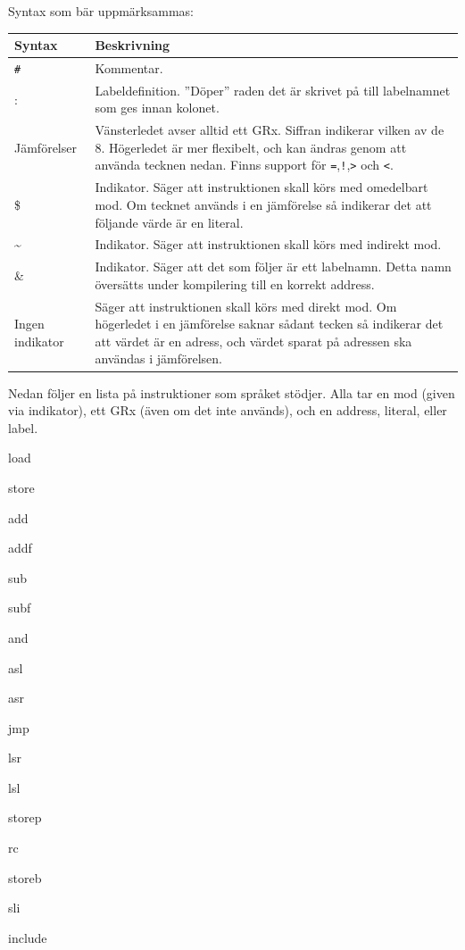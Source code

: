 \documentclass[]{article}
\begin{document}
\noindent
Syntax som bär uppmärksammas:\\

\begin{tabular}{p{2.5cm} p{8.5cm}}
\textbf{Syntax} & \textbf{Beskrivning}\\
\hline
\texttt{\#} & Kommentar.\\
: & Labeldefinition. ''Döper'' raden det är skrivet på till labelnamnet som ges innan kolonet.\\
Jämförelser & Vänsterledet avser alltid ett GRx. Siffran indikerar vilken av de 8. Högerledet är mer flexibelt, och kan ändras genom att använda tecknen nedan. Finns support för \texttt{=},\texttt{!},\texttt{>} och \texttt{<}.\\
\$ & Indikator. Säger att instruktionen skall körs med omedelbart mod. Om tecknet används i en jämförelse så indikerar det att följande värde är en literal.\\
\~{ }  & Indikator. Säger att instruktionen skall körs med indirekt mod.\\
\& & Indikator. Säger att det som följer är ett labelnamn. Detta namn översätts under kompilering till en korrekt address.\\
Ingen indikator & Säger att instruktionen skall körs med direkt mod. Om högerledet i en jämförelse saknar sådant tecken så indikerar det att värdet är en adress, och värdet sparat på adressen ska användas i jämförelsen.\\
\end{tabular}

\noindent
Nedan följer en lista på instruktioner som språket stödjer. Alla tar en mod (given via indikator), ett GRx (även om det inte används), och en address, literal, eller label.

\begin{multicols}{3}
\begin{itemize*}
\item load
\item store
\item add
\item addf
\item sub
\item subf
\item and
\item asl
\item asr
\item jmp
\item lsr
\item lsl
\item storep
\item rc
\item storeb
\item sli
\item include
\end{itemize*}
\end{multicols}
\end{document}
